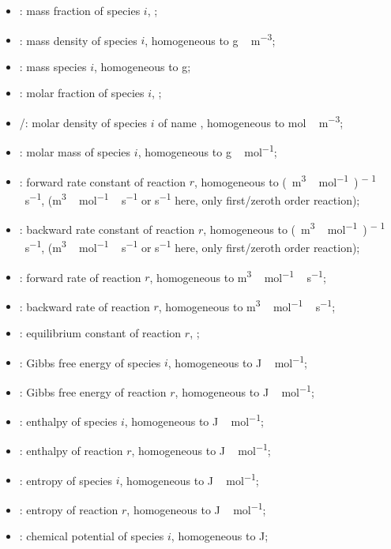 \begin{itemize}
\item \massfrac[i]:       mass fraction of species $i$, \nounit;
\item \mass[i]:           mass density of species $i$, homogeneous to \unit{g\,m^{-3}};
\item \Mass[i]:           mass species $i$, homogeneous to \unit{g};
\item \molarfrac[i]:      molar fraction of species $i$, \nounit;
\item \molar[i]/\conc[I]: molar density of species $i$ of name , homogeneous to \unit{mol\,m^{-3}};
\item \Mm[i]:             molar mass of species $i$, homogeneous to \unit{g\,mol^{-1}};
\item \fwdratecons[r]:    forward rate constant of reaction $r$, homogeneous to \unit{(m^3\,mol^{-1})^{ - 1}\,s^{-1}},
                            (\unit{m^3\,mol^{-1}\,s^{-1}} or \unit{s^{-1}} here, only first/zeroth order reaction);
\item \bkwdratecons[r]:   backward rate constant of reaction $r$, homogeneous to \unit{(m^3\,mol^{-1})^{ - 1}\,s^{-1}},
                            (\unit{m^3\,mol^{-1}\,s^{-1}} or \unit{s^{-1}} here, only first/zeroth order reaction);
\item \fwdrate[r]:        forward rate of reaction $r$, homogeneous to \unit{m^3\,mol^{-1}\,s^{-1}}; 
\item \bkwdrate[r]:       backward rate of reaction $r$, homogeneous to \unit{m^3\,mol^{-1}\,s^{-1}}; 
\item \Eqconst[r]:        equilibrium constant of reaction $r$, \nounit;
\item \gibbs[i]:          Gibbs free energy of species $i$, homogeneous to \unit{J\,mol^{-1}};
\item \DGibbs[r]:         Gibbs free energy of reaction $r$, homogeneous to \unit{J\,mol^{-1}};
\item \enth[i]:           enthalpy of species $i$, homogeneous to \unit{J\,mol^{-1}};
\item \Denth[r]:          enthalpy of reaction $r$, homogeneous to \unit{J\,mol^{-1}};
\item \entr[i]:           entropy of species $i$, homogeneous to \unit{J\,mol^{-1}};
\item \Dentr[r]:          entropy of reaction $r$, homogeneous to \unit{J\,mol^{-1}};
\item \chempot[i]:        chemical potential of species $i$, homogeneous to \unit{J};

\end{itemize}
